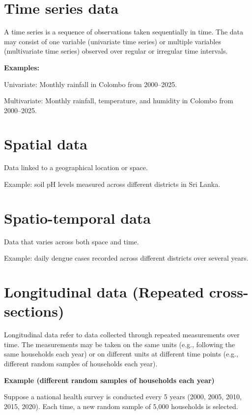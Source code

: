 \documentclass[
  11pt,
  a4paper,
]{report}
\begin{document}
\section{Time series data}\label{time-series-data}

A time series is a sequence of observations taken sequentially in time.
The data may consist of one variable (univariate time series) or
multiple variables (multivariate time series) observed over regular or
irregular time intervals.

\textbf{Examples:}

Univariate: Monthly rainfall in Colombo from 2000--2025.

Multivariate: Monthly rainfall, temperature, and humidity in Colombo
from 2000--2025.

\section{Spatial data}\label{spatial-data}

Data linked to a geographical location or space.

Example: soil pH levels measured across different districts in Sri
Lanka.

\section{Spatio-temporal data}\label{spatio-temporal-data}

Data that varies across both space and time.

Example: daily dengue cases recorded across different districts over
several years.

\section{Longitudinal data (Repeated
cross-sections)}\label{longitudinal-data-repeated-cross-sections}

Longitudinal data refer to data collected through repeated measurements
over time. The measurements may be taken on the same units (e.g.,
following the same households each year) or on different units at
different time points (e.g., different random samples of households each
year).

\textbf{Example (different random samples of households each year)}

Suppose a national health survey is conducted every 5 years (2000, 2005,
2010, 2015, 2020). Each time, a new random sample of 5,000 households is
selected.
\end{document}
